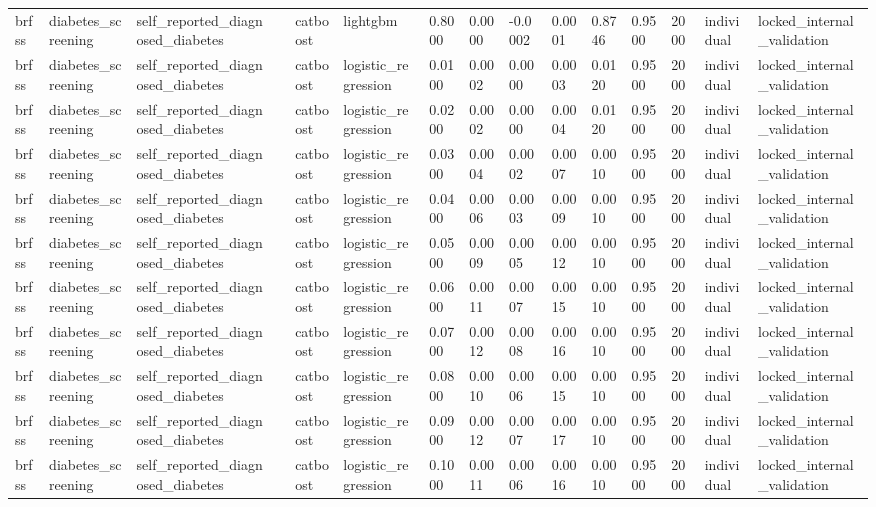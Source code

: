 \begin{tabular}{lllllllllllllll}
brfss & diabetes\_screening & self\_reported\_diagnosed\_diabetes &  & catboost & lightgbm & 0.8000 & 0.0000 & -0.0002 & 0.0001 & 0.8746 & 0.9500 & 2000 & individual & locked\_internal\_validation \\
brfss & diabetes\_screening & self\_reported\_diagnosed\_diabetes &  & catboost & logistic\_regression & 0.0100 & 0.0002 & 0.0000 & 0.0003 & 0.0120 & 0.9500 & 2000 & individual & locked\_internal\_validation \\
brfss & diabetes\_screening & self\_reported\_diagnosed\_diabetes &  & catboost & logistic\_regression & 0.0200 & 0.0002 & 0.0000 & 0.0004 & 0.0120 & 0.9500 & 2000 & individual & locked\_internal\_validation \\
brfss & diabetes\_screening & self\_reported\_diagnosed\_diabetes &  & catboost & logistic\_regression & 0.0300 & 0.0004 & 0.0002 & 0.0007 & 0.0010 & 0.9500 & 2000 & individual & locked\_internal\_validation \\
brfss & diabetes\_screening & self\_reported\_diagnosed\_diabetes &  & catboost & logistic\_regression & 0.0400 & 0.0006 & 0.0003 & 0.0009 & 0.0010 & 0.9500 & 2000 & individual & locked\_internal\_validation \\
brfss & diabetes\_screening & self\_reported\_diagnosed\_diabetes &  & catboost & logistic\_regression & 0.0500 & 0.0009 & 0.0005 & 0.0012 & 0.0010 & 0.9500 & 2000 & individual & locked\_internal\_validation \\
brfss & diabetes\_screening & self\_reported\_diagnosed\_diabetes &  & catboost & logistic\_regression & 0.0600 & 0.0011 & 0.0007 & 0.0015 & 0.0010 & 0.9500 & 2000 & individual & locked\_internal\_validation \\
brfss & diabetes\_screening & self\_reported\_diagnosed\_diabetes &  & catboost & logistic\_regression & 0.0700 & 0.0012 & 0.0008 & 0.0016 & 0.0010 & 0.9500 & 2000 & individual & locked\_internal\_validation \\
brfss & diabetes\_screening & self\_reported\_diagnosed\_diabetes &  & catboost & logistic\_regression & 0.0800 & 0.0010 & 0.0006 & 0.0015 & 0.0010 & 0.9500 & 2000 & individual & locked\_internal\_validation \\
brfss & diabetes\_screening & self\_reported\_diagnosed\_diabetes &  & catboost & logistic\_regression & 0.0900 & 0.0012 & 0.0007 & 0.0017 & 0.0010 & 0.9500 & 2000 & individual & locked\_internal\_validation \\
brfss & diabetes\_screening & self\_reported\_diagnosed\_diabetes &  & catboost & logistic\_regression & 0.1000 & 0.0011 & 0.0006 & 0.0016 & 0.0010 & 0.9500 & 2000 & individual & locked\_internal\_validation \\

\end{tabular}
